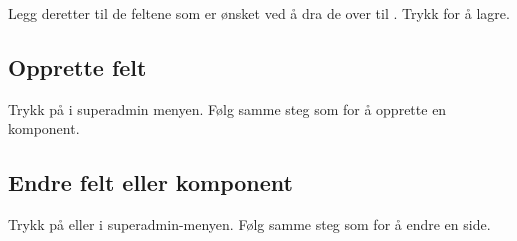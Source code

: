 Legg deretter til de feltene som er ønsket ved å dra de over til . Trykk  for å lagre.

\begin{figure}[H]
    \centering
    \label{fig:cms-superadmin-field-component}
\end{figure}

\subsection{Opprette felt}
Trykk på  i superadmin menyen. Følg samme steg som for å opprette en komponent.

\subsection{Endre felt eller komponent}
Trykk på  eller  i superadmin-menyen. Følg samme steg som for å endre en side.
